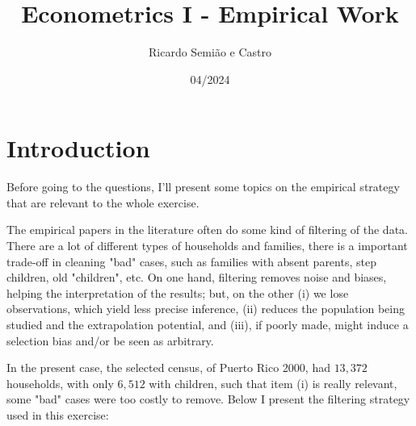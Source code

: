 \documentclass[12pt]{article}
\title{Econometrics I - Empirical Work}
\author{Ricardo Semião e Castro}
\date{04/2024}
\begin{document}
\maketitle

\section*{Introduction}

Before going to the questions, I'll present some topics on the empirical strategy that are relevant to the whole exercise.

The empirical papers in the literature often do some kind of filtering of the data. There are a lot of different types of households and families, there is a important trade-off in cleaning "bad" cases, such as families with absent parents, step children, old "children", etc. On one hand, filtering removes noise and biases, helping the interpretation of the results; but, on the other (i) we lose observations, which yield less precise inference, (ii) reduces the population being studied and the extrapolation potential, and (iii), if poorly made, might induce a selection bias and/or be seen as arbitrary.

In the present case, the selected census, of Puerto Rico 2000, had $13,372$ households, with only $6,512$ with children, such that item (i) is really relevant, some "bad" cases were too costly to remove. Below I present the filtering strategy used in this exercise:
\end{document}
